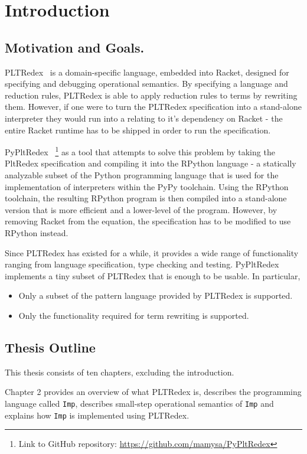 \chapter{Introduction}
\section{Motivation and Goals.}
PLTRedex~\cite{pltredex} is a domain-specific language, embedded into Racket, designed for specifying and debugging operational semantics. By specifying a language and reduction rules, PLTRedex is able to apply reduction rules to terms by rewriting them.
However, if one were to turn the PLTRedex specification into a stand-alone interpreter they would run into a relating to it's dependency on Racket - the entire Racket runtime has to be shipped in order to run the specification.

PyPltRedex~\cite{pypltredex-github} \footnote{Link to GitHub repository: \url{https://github.com/mamysa/PyPltRedex}} as a tool that attempts to solve this problem by taking the PltRedex specification and compiling it into the RPython language - a statically analyzable subset of the Python programming language that is used for the implementation of interpreters within the PyPy toolchain. Using the RPython toolchain, the resulting RPython program is then compiled into a stand-alone version that is more efficient and a lower-level of the program. However, by removing Racket from the equation, the specification has to be modified to use RPython instead.

Since PLTRedex has existed for a while, it provides a wide range of functionality ranging from language specification, type checking and testing. PyPltRedex implements a tiny subset of PLTRedex that is enough to be usable. In particular,

\begin{itemize}
\item Only a subset of the pattern language provided by PLTRedex is supported.
\item
Only the functionality required for term rewriting is supported.
\end{itemize}

\section{Thesis Outline}
This thesis consists of ten chapters, excluding the introduction.

Chapter 2 provides an overview of what PLTRedex is, describes the programming language called \texttt{Imp}, describes small-step operational semantics of \texttt{Imp} and explains how \texttt{Imp} is implemented using PLTRedex.

